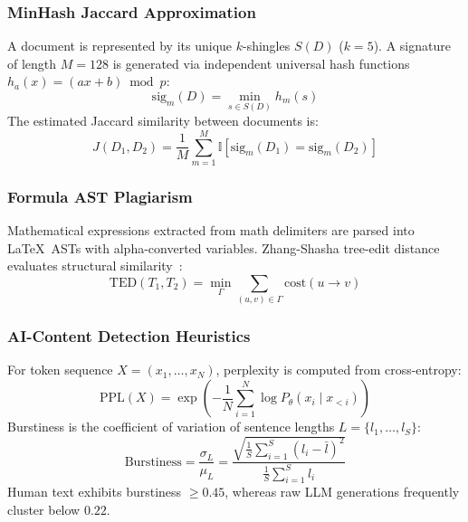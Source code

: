 \documentclass[conference]{IEEEtran}
\begin{document}
\subsubsection{MinHash Jaccard Approximation}
A document is represented by its unique $k$-shingles $S(D)$ ($k=5$). A signature of length $M=128$ is generated via independent universal hash functions $h_a(x) = (ax + b) \bmod p$:
\begin{equation}
\mathrm{sig}_m(D) = \min_{s \in S(D)} h_m(s)
\label{eq:sig}
\end{equation}
The estimated Jaccard similarity between documents is:
\begin{equation}
\hat{J}(D_1, D_2) = \frac{1}{M} \sum_{m=1}^M \mathbb{I}[\mathrm{sig}_m(D_1) = \mathrm{sig}_m(D_2)]
\label{eq:jaccard}
\end{equation}

\subsubsection{Formula AST Plagiarism}
Mathematical expressions extracted from math delimiters are parsed into \LaTeX\ ASTs with alpha-converted variables. Zhang-Shasha tree-edit distance evaluates structural similarity~\cite{zhang1989tree}:
\begin{equation}
\mathrm{TED}(T_1, T_2) = \min_{\Gamma} \sum_{(u,v) \in \Gamma} \mathrm{cost}(u \to v)
\label{eq:ted}
\end{equation}

\subsubsection{AI-Content Detection Heuristics}
For token sequence $X = (x_1, \ldots, x_N)$, perplexity is computed from cross-entropy:
\begin{equation}
\mathrm{PPL}(X) = \exp\left( -\frac{1}{N} \sum_{i=1}^N \log P_\theta(x_i \mid x_{<i}) \right)
\label{eq:ppl}
\end{equation}
Burstiness is the coefficient of variation of sentence lengths $L = \{l_1, \ldots, l_S\}$:
\begin{equation}
\mathrm{Burstiness} = \frac{\sigma_L}{\mu_L} = \frac{\sqrt{\frac{1}{S}\sum_{i=1}^S (l_i - \bar{l})^2}}{\frac{1}{S}\sum_{i=1}^S l_i}
\label{eq:burstiness}
\end{equation}
Human text exhibits burstiness $\ge 0.45$, whereas raw LLM generations frequently cluster below $0.22$.

\end{document}

